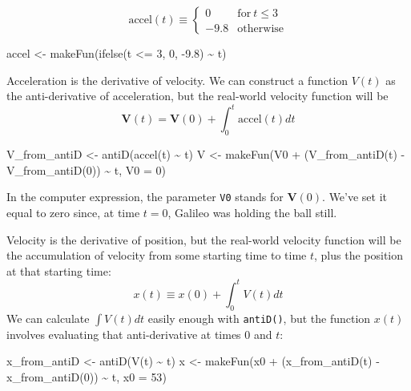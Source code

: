 \documentclass[
  letterpaper,
  DIV=11,
  numbers=noendperiod,
  oneside]{scrreprt}
\newenvironment{Shaded}{\begin{snugshade}}{\end{snugshade}}
\newcommand{\AttributeTok}[1]{\textcolor[rgb]{0.40,0.46,0.14}{#1}}
\newcommand{\DecValTok}[1]{\textcolor[rgb]{0.68,0.00,0.00}{#1}}
\newcommand{\FloatTok}[1]{\textcolor[rgb]{0.68,0.00,0.00}{#1}}
\newcommand{\FunctionTok}[1]{\textcolor[rgb]{0.28,0.35,0.67}{#1}}
\newcommand{\NormalTok}[1]{\textcolor[rgb]{0.00,0.46,0.62}{#1}}
\newcommand{\OtherTok}[1]{\textcolor[rgb]{0.00,0.46,0.62}{#1}}
\newcommand{\SpecialCharTok}[1]{\textcolor[rgb]{0.37,0.37,0.37}{#1}}
\begin{document}
\[\text{accel}(t) \equiv \left\{\begin{array}{rl}0 & \text{for}\ t \leq 3\\
{-9.8}  & \text{otherwise}\end{array}\right.\]

\begin{Shaded}
\begin{Highlighting}[]
\NormalTok{accel }\OtherTok{\textless{}{-}} \FunctionTok{makeFun}\NormalTok{(}\FunctionTok{ifelse}\NormalTok{(t }\SpecialCharTok{\textless{}=} \DecValTok{3}\NormalTok{, }\DecValTok{0}\NormalTok{, }\SpecialCharTok{{-}}\FloatTok{9.8}\NormalTok{) }\SpecialCharTok{\textasciitilde{}}\NormalTok{ t)}
\end{Highlighting}
\end{Shaded}

Acceleration is the derivative of velocity. We can construct a function
\(V(t)\) as the anti-derivative of acceleration, but the real-world
velocity function will be
\[{\mathbf V}(t) = {\mathbf V}(0) + \int_0^t \text{accel}(t) dt\]

\begin{Shaded}
\begin{Highlighting}[]
\NormalTok{V\_from\_antiD }\OtherTok{\textless{}{-}} \FunctionTok{antiD}\NormalTok{(}\FunctionTok{accel}\NormalTok{(t) }\SpecialCharTok{\textasciitilde{}}\NormalTok{ t)}
\NormalTok{V }\OtherTok{\textless{}{-}} \FunctionTok{makeFun}\NormalTok{(V0 }\SpecialCharTok{+}\NormalTok{ (}\FunctionTok{V\_from\_antiD}\NormalTok{(t) }\SpecialCharTok{{-}} \FunctionTok{V\_from\_antiD}\NormalTok{(}\DecValTok{0}\NormalTok{)) }\SpecialCharTok{\textasciitilde{}}\NormalTok{ t, }\AttributeTok{V0 =} \DecValTok{0}\NormalTok{)}
\end{Highlighting}
\end{Shaded}

In the computer expression, the parameter \texttt{V0} stands for
\({\mathbf V}(0)\). We've set it equal to zero since, at time \(t=0\),
Galileo was holding the ball still.

Velocity is the derivative of position, but the real-world velocity
function will be the accumulation of velocity from some starting time to
time \(t\), plus the position at that starting time:
\[x(t) \equiv x(0) + \int_0^t V(t) dt\] We can calculate
\(\int V(t) dt\) easily enough with \texttt{antiD()}, but the function
\(x(t)\) involves evaluating that anti-derivative at times 0 and \(t\):

\begin{Shaded}
\begin{Highlighting}[]
\NormalTok{x\_from\_antiD }\OtherTok{\textless{}{-}} \FunctionTok{antiD}\NormalTok{(}\FunctionTok{V}\NormalTok{(t) }\SpecialCharTok{\textasciitilde{}}\NormalTok{ t)}
\NormalTok{x }\OtherTok{\textless{}{-}} \FunctionTok{makeFun}\NormalTok{(x0 }\SpecialCharTok{+}\NormalTok{ (}\FunctionTok{x\_from\_antiD}\NormalTok{(t) }\SpecialCharTok{{-}} \FunctionTok{x\_from\_antiD}\NormalTok{(}\DecValTok{0}\NormalTok{)) }\SpecialCharTok{\textasciitilde{}}\NormalTok{ t, }\AttributeTok{x0 =} \DecValTok{53}\NormalTok{)}
\end{Highlighting}
\end{Shaded}
\end{document}

